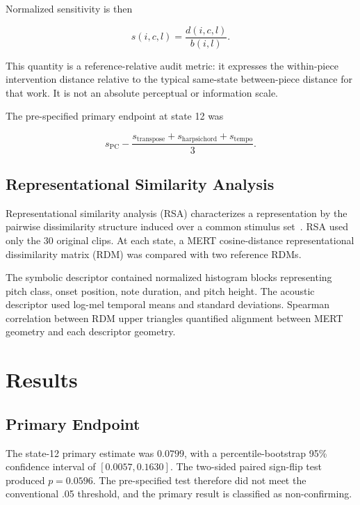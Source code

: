 \documentclass[conference]{IEEEtran}
\begin{document}
Normalized sensitivity is then

\begin{equation}
s(i,c,l)
=
\frac{d(i,c,l)}{b(i,l)}.
\label{eq:sensitivity}
\end{equation}

This quantity is a reference-relative audit metric: it expresses the
within-piece intervention distance relative to the typical same-state
between-piece distance for that work.
It is not an absolute perceptual or information scale.

The pre-specified primary endpoint at state 12 was

\begin{equation}
s_{\mathrm{PC}}
-
\frac{
s_{\mathrm{transpose}}
+
s_{\mathrm{harpsichord}}
+
s_{\mathrm{tempo}}
}{3}.
\label{eq:primary}
\end{equation}

\subsection{Representational Similarity Analysis}

Representational similarity analysis (RSA) characterizes a representation by
the pairwise dissimilarity structure induced over a common stimulus
set~\cite{kriegeskorte2008rsa,nili2014toolbox}.
RSA used only the 30 original clips.
At each state, a MERT cosine-distance representational dissimilarity matrix
(RDM) was compared with two reference RDMs.

The symbolic descriptor contained normalized histogram blocks representing
pitch class, onset position, note duration, and pitch height.
The acoustic descriptor used log-mel temporal means and standard deviations.
Spearman correlation between RDM upper triangles quantified alignment between
MERT geometry and each descriptor geometry.

\section{Results}

\subsection{Primary Endpoint}

The state-12 primary estimate was $0.0799$, with a percentile-bootstrap 95\%
confidence interval of $[0.0057, 0.1630]$.
The two-sided paired sign-flip test produced $p=0.0596$.
The pre-specified test therefore did not meet the conventional .05 threshold,
and the primary result is classified as non-confirming.
\end{document}
